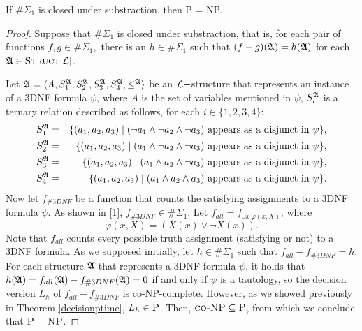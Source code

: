 \begin{theo}
If $\#\Sigma_1$ is closed under substraction, then {\sc P} = {\sc NP}.
\end{theo}
\begin{proof}
Suppose that $\#\Sigma_1$ is closed under substraction, that is, for each pair of functions $f,g\in\#\Sigma_1,$ there is an $h\in\#\Sigma_1$ such that $(f\dotminus g)(\A) = h(\A)$ for each ${\frak A}\in\textsc{Struct}[{\cal L}]$.

Let ${\frak A} = \langle A, S_1^{\frak A}, S_2^{\frak A}, S_3^{\frak A}, S_4^{\frak A}, \leq^{\frak A} \rangle$ be an ${\cal L}-$structure that represents an instance of a 3DNF formula $\psi$, where $A$ is the set of variables mentioned in $\psi$, $S_i^{\frak A}$ is a ternary relation described as follows, for each $i\in\{1,2,3,4\}$:
\begin{eqnarray*}
S_1^{\frak A} &=& \{(a_1,a_2,a_3)\mid (\neg a_1 \wedge \neg a_2 \wedge \neg a_3) \mbox{ appears as a disjunct in }\psi\},\\
S_2^{\frak A} &=& \{(a_1,a_2,a_3)\mid ( a_1 \wedge \neg a_2 \wedge \neg a_3) \mbox{ appears as a disjunct in }\psi\},\\
S_3^{\frak A} &=& \{(a_1,a_2,a_3)\mid ( a_1 \wedge  a_2 \wedge \neg a_3) \mbox{ appears as a disjunct in }\psi\},\\
S_4^{\frak A} &=& \{(a_1,a_2,a_3)\mid ( a_1 \wedge  a_2 \wedge  a_3) \mbox{ appears as a disjunct in }\psi\}.
\end{eqnarray*}
Now let $f_{\#3DNF}$ be a function that counts the satisfying assignments to a 3DNF formula $\psi$. As shown in [1], $f_{\#3DNF} \in \#\Sigma_1$. Let $f_{all} = f_{\exists x\:\varphi(x,X)}$, where
$$
\varphi(x,X) = (X(x) \vee \neg X(x)).
$$
Note that $f_{all}$ counts every possible truth assignment (satisfying or not) to a 3DNF formula. As we supposed initially, let $h\in\#\Sigma_1$ such that $f_{all}-f_{\#3DNF} = h$. For each structure ${\frak A}$ that represents a 3DNF formula $\psi$, it holds that $h({\frak A}) = f_{all}({\frak A})-f_{\#3DNF}({\frak A}) = 0$ if and only if $\psi$ is a tautology, so the decision version $L_h$ of $f_{all}-f_{\#3DNF}$ is {\sc co-NP}-complete. However, as we showed previously in Theorem \ref{decisionptime}, $L_h \in \textsc{P}$. Then, $\textsc{co-NP} \subseteq \textsc{P}$, from which we conclude that $\textsc{P} = \textsc{NP}$.
\end{proof}